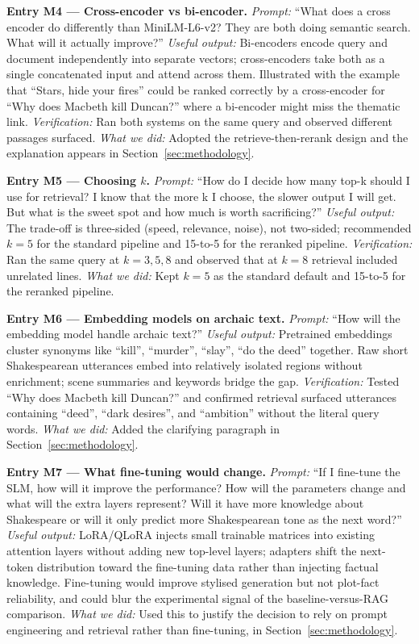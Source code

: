 \documentclass[10pt,conference]{IEEEtran}
\begin{document}
\textbf{Entry M4 --- Cross-encoder vs bi-encoder.}
\textit{Prompt:} ``What does a cross encoder do differently than
MiniLM-L6-v2? They are both doing semantic search. What will it
actually improve?''
\textit{Useful output:} Bi-encoders encode query and document
independently into separate vectors; cross-encoders take both as a
single concatenated input and attend across them. Illustrated with
the example that ``Stars, hide your fires'' could be ranked
correctly by a cross-encoder for ``Why does Macbeth kill Duncan?''
where a bi-encoder might miss the thematic link.
\textit{Verification:} Ran both systems on the same query and
observed different passages surfaced.
\textit{What we did:} Adopted the retrieve-then-rerank design and
the explanation appears in Section~\ref{sec:methodology}.

\textbf{Entry M5 --- Choosing $k$.}
\textit{Prompt:} ``How do I decide how many top-k should I use for
retrieval? I know that the more k I choose, the slower output I
will get. But what is the sweet spot and how much is worth
sacrificing?''
\textit{Useful output:} The trade-off is three-sided (speed,
relevance, noise), not two-sided; recommended $k=5$ for the
standard pipeline and 15-to-5 for the reranked pipeline.
\textit{Verification:} Ran the same query at $k=3, 5, 8$ and
observed that at $k=8$ retrieval included unrelated lines.
\textit{What we did:} Kept $k=5$ as the standard default and
15-to-5 for the reranked pipeline.

\textbf{Entry M6 --- Embedding models on archaic text.}
\textit{Prompt:} ``How will the embedding model handle archaic
text?''
\textit{Useful output:} Pretrained embeddings cluster
synonyms like ``kill'', ``murder'', ``slay'', ``do the deed''
together. Raw short Shakespearean utterances embed into relatively
isolated regions without enrichment; scene summaries and keywords
bridge the gap.
\textit{Verification:} Tested ``Why does Macbeth kill Duncan?''
and confirmed retrieval surfaced utterances containing ``deed'',
``dark desires'', and ``ambition'' without the literal query words.
\textit{What we did:} Added the clarifying paragraph in
Section~\ref{sec:methodology}.

\textbf{Entry M7 --- What fine-tuning would change.}
\textit{Prompt:} ``If I fine-tune the SLM, how will it improve the
performance? How will the parameters change and what will the extra
layers represent? Will it have more knowledge about Shakespeare or
will it only predict more Shakespearean tone as the next word?''
\textit{Useful output:} LoRA/QLoRA injects small trainable matrices
into existing attention layers without adding new top-level layers;
adapters shift the next-token distribution toward the fine-tuning
data rather than injecting factual knowledge. Fine-tuning would
improve stylised generation but not plot-fact reliability, and
could blur the experimental signal of the baseline-versus-RAG
comparison.
\textit{What we did:} Used this to justify the decision to rely on
prompt engineering and retrieval rather than fine-tuning, in
Section~\ref{sec:methodology}.
\end{document}
